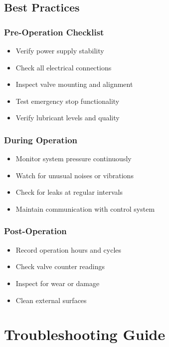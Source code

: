 \documentclass[11pt,a4paper]{article}
\begin{document}
\subsection{Best Practices}

\subsubsection{Pre-Operation Checklist}
\begin{itemize}[label=$\square$]
    \item Verify power supply stability
    \item Check all electrical connections
    \item Inspect valve mounting and alignment
    \item Test emergency stop functionality
    \item Verify lubricant levels and quality
\end{itemize}

\subsubsection{During Operation}
\begin{itemize}
    \item Monitor system pressure continuously
    \item Watch for unusual noises or vibrations
    \item Check for leaks at regular intervals
    \item Maintain communication with control system
\end{itemize}

\subsubsection{Post-Operation}
\begin{itemize}
    \item Record operation hours and cycles
    \item Check valve counter readings
    \item Inspect for wear or damage
    \item Clean external surfaces
\end{itemize}

\section{Troubleshooting Guide}
\end{document}
